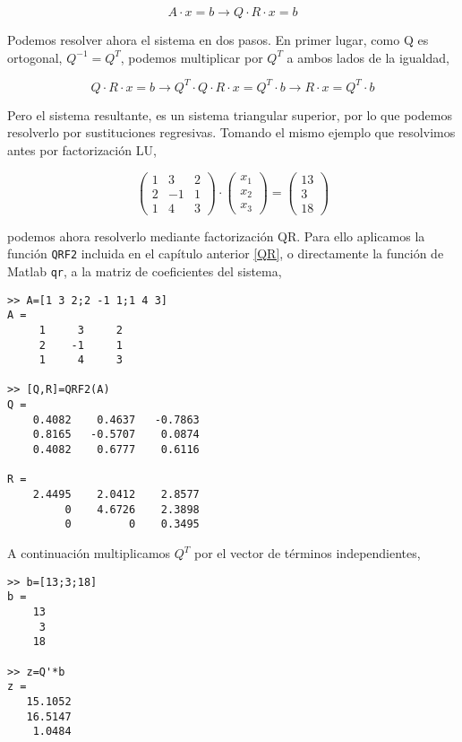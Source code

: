 \begin{equation*}
A\cdot x=b \rightarrow Q\cdot R\cdot x =b
\end{equation*}

Podemos resolver ahora el sistema en dos pasos. En primer lugar, como Q es ortogonal, $Q^{-1}=Q^T$, podemos multiplicar por $Q^T$ a ambos lados de la igualdad,

\begin{equation*}
Q\cdot R\cdot x =b \rightarrow Q^T\cdot Q\cdot R\cdot x = Q^T \cdot b \rightarrow R\cdot x= Q^T\cdot b
\end{equation*}

Pero el sistema resultante, es un sistema triangular superior, por lo que podemos resolverlo por sustituciones regresivas. Tomando el mismo ejemplo que resolvimos antes por factorización LU,

\begin{equation*}
\begin{pmatrix}
1& 3& 2\\
2& -1& 1\\
1& 4& 3
\end{pmatrix}\cdot \begin{pmatrix}
x_1\\
x_2\\
x_3
\end{pmatrix}=\begin{pmatrix}
13\\
3\\
18
\end{pmatrix}
\end{equation*}

podemos ahora resolverlo mediante factorización QR. Para ello aplicamos la función \texttt{QRF2} incluida en el capítulo anterior \ref{QR}, o directamente la función de Matlab \texttt{qr}, a la matriz de coeficientes del sistema,

\begin{verbatim}
>> A=[1 3 2;2 -1 1;1 4 3]
A =
     1     3     2
     2    -1     1
     1     4     3

>> [Q,R]=QRF2(A)
Q =
    0.4082    0.4637   -0.7863
    0.8165   -0.5707    0.0874
    0.4082    0.6777    0.6116

R =
    2.4495    2.0412    2.8577
         0    4.6726    2.3898
         0         0    0.3495
\end{verbatim}

A continuación multiplicamos $Q^T$ por el vector de términos independientes,

\begin{verbatim}
>> b=[13;3;18]
b =
    13
     3
    18

>> z=Q'*b
z =
   15.1052
   16.5147
    1.0484
\end{verbatim}

